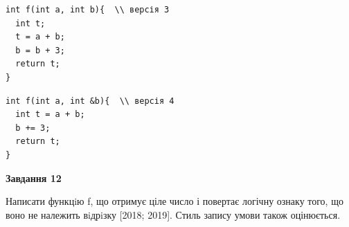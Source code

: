 \documentclass[12pt, ukrainian]{article}
\begin{document}
{\begin {large}
\begin{minipage}[t]{11.0cm}
\vspace{-8mm}\begin{verbatim}
int f(int a, int b){  \\ версія 3
  int t;
  t = a + b;
  b = b + 3;
  return t;
}
\end{verbatim}

\vspace{-8mm}\begin{verbatim}
int f(int a, int &b){  \\ версія 4
  int t = a + b;
  b += 3;
  return t;
}
\end{verbatim}



\begin{center}
\textbf{Завдання 12}
\end{center}

Написати функцiю f, що отримує ціле число і повертає логічну ознаку того, що воно не належить вiдрiзку [2018; 2019]. Стиль запису умови також оцінюється.\par

\end{minipage}

\end {large}}
\newpage
\end{document}
